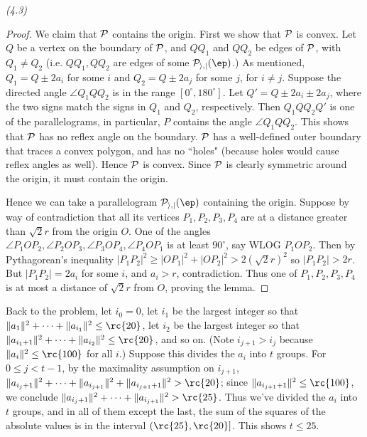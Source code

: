\begin{problem} {\it (4.3)}
\begin{proof}
We claim that $\cal P$ contains the origin. First we show that $\cal P$ is convex. %
Let $Q$ be a vertex on the boundary of $\cal P$, %
and $QQ_1$ and $QQ_2$ be edges of $\cal P$, with $Q_1\ne Q_2$ (i.e. $QQ_1,QQ_2$ are edges of some $\cal P_{i,j}(\ep)$.)
As mentioned, $Q_1=Q\pm 2a_i$ for some $i$ and $Q_2=Q\pm 2a_j$ for some $j$, for $i\neq j$. 
Suppose the directed angle $\angle Q_1QQ_2$ is in the range $[0^{\circ},180^{\circ}]$. Let $Q'=Q\pm 2a_i\pm 2a_j$, where the two signs match the signs in $Q_1$ and $Q_2$, respectively. Then $Q_1QQ_2Q'$ is one of the parallelograms, in particular, $P$ contains the angle $\angle Q_1QQ_2$. %
This shows that $\cal P$ has no reflex angle on the boundary. $\cal P$ has a well-defined outer boundary that traces a convex polygon, and has no ``holes" (because holes would cause reflex angles as well). Hence $\cal P$ is convex. Since $\cal P$ is clearly symmetric around the origin, it must contain the origin.

Hence we can take a parallelogram $\cal P_{i,j}(\ep)$ containing the origin. Suppose by way of contradiction that all its vertices $P_1,P_2,P_3,P_4$ are at a distance greater than $\sqrt 2 r$ from the origin $O$. One of the angles $\angle P_1OP_2,\angle P_2OP_3,\angle P_3OP_4,\angle P_4OP_1$ is at least $90^{\circ}$, say WLOG $P_1OP_2$. Then by Pythagorean's inequality $|P_1P_2|^2\ge |OP_1|^2+|OP_2|^2> 2(\sqrt 2r)^2$ so $|P_1P_2|>2r$. But $|P_1P_2|=2a_i$ for some $i$, and $a_i>r$, contradiction. Thus one of $P_1,P_2,P_3,P_4$ is at most a distance of $\sqrt 2r$ from $O$, proving the lemma. 
\end{proof}
Back to the problem, let $i_0=0$, let $i_1$ be the largest integer so that $\Vert a_1\Vert^2 +\cdots +\Vert a_{i_1}\Vert ^2\le \rc{20}$, let $i_2$ be the largest integer so that $\Vert a_{i_1+1}\Vert^2 +\cdots +\Vert a_{i_2}\Vert^2 \le \rc {20}$, and so on. (Note $i_{j+1}>i_j$ because $\Vert a_i\Vert^2\le \rc{100}$ for all $i$.) Suppose this divides the $a_i$ into $t$ groups. For $0\le j<t-1$, by the maximality assumption on $i_{j+1}$,  $\Vert a_{i_j+1}\Vert^2 +\cdots +\Vert a_{i_{j+1}}\Vert ^2+\Vert a_{i_{j+1}+1}\Vert^2 >\rc {20}$; since $\Vert a_{i_{j+1}+1}\Vert^2\le \rc{100}$, we conclude $\Vert a_{i_j+1}\Vert^2 +\cdots +\Vert a_{i_{j+1}}\Vert^2 >\rc{25}$. Thus we've divided the $a_i$ into $t$ groups, and in all of them except the last, the sum of the squares of the absolute values is in the interval $(\rc{25},\rc{20}]$. This shows $t\le 25$.


\end{problem}
